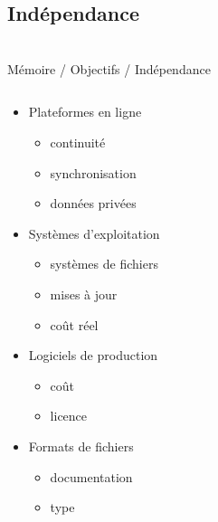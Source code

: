 \subsection{Indépendance}\begin{frame}
{\bititle\\Mémoire / Objectifs / Indépendance}
\begin{columns}\begin{column}{.5\textwidth}
\begin{itemize}
\item<1-> Plateformes en ligne\begin{itemize}
    \item<2-> continuité
    \item<3-> synchronisation
    \item<4-> données privées
    \end{itemize}
\item<6-> Systèmes d’exploitation\begin{itemize}
    \item<9-> systèmes de fichiers
    \item<10-> mises à jour
    \item<11-> coût réel
    \end{itemize}
\item<14-> Logiciels de production\begin{itemize}
    \item<15-> coût
    \item<18-> licence
    \end{itemize}
\item<21-> Formats de fichiers\begin{itemize}
    \item<22-> documentation
    \item<25-> type
    \end{itemize}
\end{itemize}
\end{column}\begin{column}{.5\textwidth}



\end{column}
\end{columns}
\end{frame}
